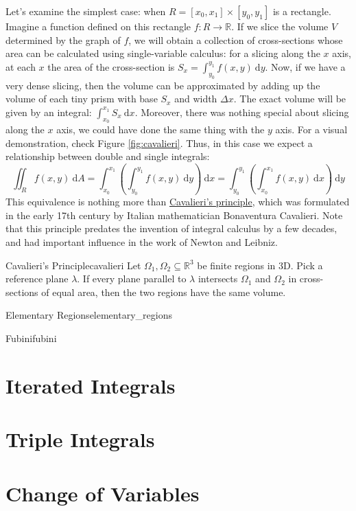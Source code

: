 Let's examine the simplest case: when $R = [x_0, x_1] \times [y_0, y_1]$ is a rectangle. Imagine a function defined on this rectangle $f: R\rightarrow \mathbb{R}$. If we slice the volume $V$ determined by the graph of $f$, we will obtain a collection of cross-sections whose area can be calculated using single-variable calculus: for a slicing along the $x$ axis, at each $x$ the area of the cross-section is $S_x = \int_{y_0}^{y_1} f(x, y) \ \mathrm{d} y$. Now, if we have a very dense slicing, then the volume can be approximated by adding up the volume of each tiny prism with base $S_x$ and width $\Delta x$. The exact volume will be given by an integral: $\int_{x_0}^{x_1} S_x \ \mathrm{d} x$. Moreover, there was nothing special about slicing along the $x$ axis, we could have done the same thing with the $y$ axis. For a visual demonstration, check Figure \ref{fig:cavalieri}. Thus, in this case we expect a relationship between double and single integrals:
\begin{equation}
    \iint_R f(x,y) \ \mathrm{d} A = \int_{x_0}^{x_1} \left( \int_{y_0}^{y_1} f(x,y) \ \mathrm{d} y\right) \ \mathrm{d} x = \int_{y_0}^{y_1} \left( \int_{x_0}^{x_1} f(x,y) \ \mathrm{d} x\right) \ \mathrm{d} y
\end{equation}
This equivalence is nothing more than \hyperref[thm:cavalieri]{Cavalieri's principle}, which was formulated in the early 17th century by Italian mathematician Bonaventura Cavalieri. Note that this principle predates the invention of integral calculus by a few decades, and had important influence in the work of Newton and Leibniz.


\begin{atheorem}{Cavalieri's Principle}{cavalieri}
    Let $\Omega_1, \Omega_2 \subseteq \mathbb{R}^3$ be finite regions in $3\text{D}$. Pick a reference plane $\lambda$. If every plane parallel to $\lambda$ intersects $\Omega_1$ and $\Omega_2$ in cross-sections of equal area, then the two regions have the same volume.
    
\end{atheorem}

\begin{adefinition}{Elementary Regions}{elementary_regions}
    
\end{adefinition}

\begin{atheorem}{Fubini}{fubini}
    
\end{atheorem}

\section{Iterated Integrals}

\section{Triple Integrals}


\section{Change of Variables}